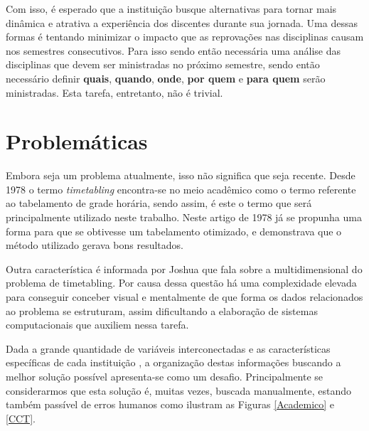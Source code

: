 Com isso, é esperado que a instituição busque alternativas para tornar mais dinâmica e atrativa a experiência dos discentes durante sua jornada. Uma dessas formas é tentando minimizar o impacto que as reprovações nas disciplinas causam nos semestres consecutivos. Para isso sendo então necessária uma análise das disciplinas que devem ser ministradas no próximo semestre, sendo então necessário definir \textbf{quais}, \textbf{quando}, \textbf{onde}, \textbf{por quem} e \textbf{para quem} serão ministradas. Esta tarefa, entretanto, não é trivial.

\section{Problemáticas} %

    Embora seja um problema atualmente, isso não significa que seja recente. Desde 1978 \cite{barham_simple_1978} o termo \textit{timetabling} encontra-se no meio acadêmico como o termo referente ao tabelamento de grade horária, sendo assim, é este o termo que será principalmente utilizado neste trabalho. Neste artigo de 1978 já se propunha uma forma para que se obtivesse um tabelamento otimizado, e demonstrava que o método utilizado gerava bons resultados.

    Outra característica é informada por Joshua \cite{thomas_visualization_2009} que fala sobre a multidimensional do problema de timetabling. Por causa dessa questão há uma complexidade elevada para conseguir conceber visual e mentalmente de que forma os dados relacionados ao problema se estruturam, assim dificultando a elaboração de sistemas computacionais que auxiliem nessa tarefa.

    Dada a grande quantidade de variáveis interconectadas e as características específicas de cada instituição \cite{miranda_udpskeduler_2012}, a organização destas informações buscando a melhor solução possível apresenta-se como um desafio. Principalmente se considerarmos que esta solução é, muitas vezes, buscada manualmente, estando também passível de erros humanos como ilustram as Figuras \ref{Academico} e \ref{CCT}.



